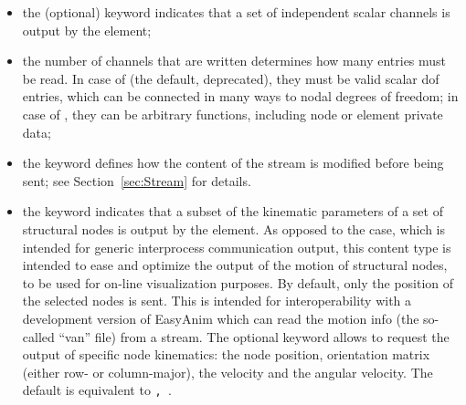 \begin{itemize}
\item the (optional) keyword  indicates that a set
of independent scalar channels is output by the element;

\item the number of channels  that are written
determines how many  entries must be read.
In case of  (the default, deprecated),
they must be valid scalar dof entries, which can be connected
in many ways to nodal degrees of freedom;
in case of , they can be arbitrary functions,
including node or element private data;

\item the keyword  defines how the content of the stream
is modified before being sent;
see Section~\ref{sec:Stream} for details.

\item the keyword  indicates that a subset of the kinematic
parameters of a set of structural nodes is output by the element.
As opposed to the  case, which is intended for generic
interprocess communication output, this content type is intended to ease
and optimize the output of the motion of structural nodes,
to be used for on-line visualization purposes.
By default, only the position of the selected nodes is sent.
This is intended for interoperability with a development version
of EasyAnim which can read the motion info (the so-called ``van'' file)
from a stream.
The optional keyword  allows to request the output
of specific node kinematics: the node position, orientation matrix
(either row- or column-major), the velocity and the angular velocity.
The default is equivalent to \texttt{, }.
\end{itemize}




